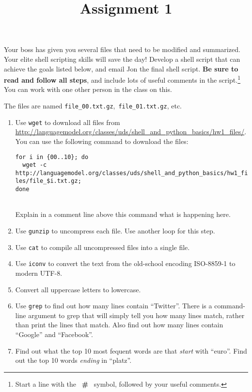 \documentclass[11pt]{article}
\title{Assignment 1}
\begin{document}
\maketitle


\begin{spacing}{1.35}
Your boss has given you several files that need to be modified and summarized.
Your elite shell scripting skills will save the day!
Develop a shell script that can achieve the goals listed below, and email Jon the final shell script.
\textbf{Be sure to read and follow all steps}, and include lots of useful comments in the script.\footnote{Start a line with the \, \textbf{\#} \, symbol, followed by your useful comments.}
You can work with one other person in the class on this.

The files are named \texttt{file\_00.txt.gz}, \,\texttt{file\_01.txt.gz}, etc.

\begin{enumerate}
	\item Use \texttt{wget} to download all files from \url{http://languagemodel.org/classes/uds/shell_and_python_basics/hw1_files/}.
		You can use the following command to download the files: \\
		\begin{footnotesize}
		\verb|for i in {00..10}; do| \\
		\verb|  wget -c http://languagemodel.org/classes/uds/shell_and_python_basics/hw1_files/file_$i.txt.gz;| \\
		\verb|done|
		\end{footnotesize} \\
		Explain in a comment line above this command what is happening here.
	\item Use \texttt{gunzip} to uncompress each file.  Use another loop for this step.
	\item Use \texttt{cat} to compile all uncompressed files into a single file.%
	\item Use \texttt{iconv} to convert the text from the old-school encoding \mbox{ISO-8859-1} to modern \mbox{UTF-8}.
	\item Convert all uppercase letters to lowercase.
	\item Use \texttt{grep} to find out how many lines contain ``Twitter''.  There is a command-line argument to grep that will simply tell you how many lines match, rather than print the lines that match.  Also find out how many lines contain ``Google'' and ``Facebook''.
	\item Find out what the top 10 most fequent words are that \emph{start} with ``euro''.  Find out the top 10 words \emph{ending} in ``platz''.
\end{enumerate}

\end{spacing}
%
\end{document}
